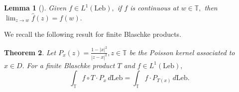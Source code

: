 \documentclass[12pt,reqno]{amsart}
\newtheorem{theorem}{Theorem}
\numberwithin{theorem}{section}
\newtheorem{remark}[theorem]{Remark}%
\newtheorem{lemma}[theorem]{Lemma}
\begin{document}
\begin{lemma}[{\cite[Theorem 1.2(b)]{Mane1991}}]\label{harmonic_limit}
    Given $f\in L^1(\text{Leb}),$ if $f$ is continuous at $w\in\mathbb{T},$ then $\lim_{z\to w}\hat{f}(z)=f(w).$
\end{lemma}


We recall the following result for finite Blaschke products.
\begin{theorem}\label{poisson_kernel}
    Let $P_{x}(z)=\frac{1-|x|^2}{|z-x|^2}, z\in\mathbb{T}$ be the Poisson kernel associated to $x\in D.$ For a finite Blaschke product $T$ and $f\in L^{1}(\text{Leb}),$ $$\int_{\mathbb{T}}f\circ T\cdot P_{x}\,d\text{Leb}=\int_{\mathbb{T}}f\cdot P_{T(x)}\,d\text{Leb}.$$
\end{theorem}
\end{document}
